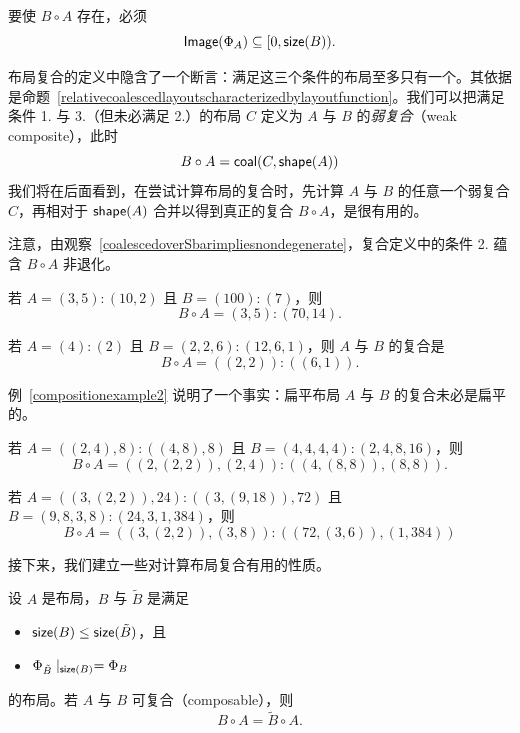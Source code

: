 \begin{remark}
    要使 $B \circ A$ 存在，必须
    \[
    \mathsf{Image}(\Phi_A) \subseteq [0,\mathsf{size}(B)).
    \]
\end{remark}

\begin{remark}
    布局复合的定义中隐含了一个断言：满足这三个条件的布局至多只有一个。其依据是命题~\ref{relativecoalescedlayoutscharacterizedbylayoutfunction}。我们可以把满足条件 1. 与 3.（但未必满足 2.）的布局 $C$ 定义为 $A$ 与 $B$ 的{\it 弱复合}（weak composite），此时
    \[
    B \circ A = \mathsf{coal}(C,\mathsf{shape}(A))
    \]
    我们将在后面看到，在尝试计算布局的复合时，先计算 $A$ 与 $B$ 的任意一个弱复合 $C$，再相对于 $\mathsf{shape}(A)$ 合并以得到真正的复合 $B \circ A$，是很有用的。
\end{remark}

\begin{remark}
注意，由观察~\ref{coalescedoverSbarimpliesnondegenerate}，复合定义中的条件 2. 蕴含 $B \circ A$ 非退化。
\end{remark}

\begin{example}\label{compositionexample1}
若 $A = (3,5):(10,2)$ 且 $B = (100):(7)$，则
\[
B \circ A = (3,5):(70,14).
\]
\end{example}

\begin{example}\label{compositionexample2}
    若 $A = (4):(2)$ 且 $B = (2,2,6):(12,6,1)$，则 $A$ 与 $B$ 的复合是
    \[
    B \circ A = ((2,2)):((6,1)).
    \]
\end{example}

\begin{remark}
    例~\ref{compositionexample2} 说明了一个事实：扁平布局 $A$ 与 $B$ 的复合未必是扁平的。
\end{remark}

\begin{example}
    若 $A = ((2,4),8):((4,8),8)$ 且 $B = (4,4,4,4):(2,4,8,16)$，则
    \[
    B \circ A = ( (2,(2,2)),(2,4) ): ( (4,(8,8)) , (8,8) ).
    \]
\end{example}

\begin{example}
    若 $A = ((3,(2,2)),24):((3,(9,18)),72)$ 且 $B = (9,8,3,8):(24,3,1,384) $，则
    \[
    B \circ A = ((3,(2,2)),(3,8) ) : ((72,(3,6)),(1,384) )
    \]
\end{example}

接下来，我们建立一些对计算布局复合有用的性质。

\begin{proposition}\label{postcomposewithextension}
    设 $A$ 是布局，$B$ 与 $\tilde{B}$ 是满足
    \begin{itemize}
        \item $\mathsf{size}(B) \leq \mathsf{size}(\tilde{B})$，且
        \item $\Phi_{\tilde{B}} \mid_{\mathsf{size}(B)} = \Phi_B$
    \end{itemize}
    的布局。若 $A$ 与 $B$ 可复合（composable），则
    \[
    B \circ A = \tilde{B} \circ A.
    \]
\end{proposition}

